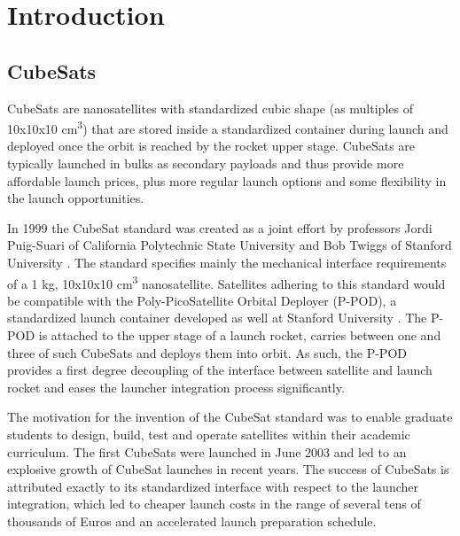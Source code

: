 \chapter{Introduction}

\section{CubeSats}

CubeSats are nanosatellites with standardized cubic shape (as multiples of 10x10x10 cm\textsuperscript{3}) that are stored inside a standardized container during launch and deployed once the orbit is reached by the rocket upper stage. CubeSats are typically launched in bulks as secondary payloads and thus provide more affordable launch prices, plus more regular launch options and some flexibility in the launch opportunities.

In 1999 the CubeSat standard was created as a joint effort by professors Jordi Puig-Suari of California Polytechnic State University and Bob Twiggs of Stanford University \cite{heidt2000cubesat}. The standard specifies mainly the mechanical interface requirements of a 1 kg, 10x10x10 cm\textsuperscript{3} nanosatellite. Satellites adhering to this standard would be compatible with the Poly-PicoSatellite Orbital Deployer (P-POD), a standardized launch container developed as well at Stanford University \cite{nason2002development}. The P-POD is attached to the upper stage of a launch rocket, carries between one and three of such CubeSats and deploys them into orbit. As such, the P-POD provides a first degree decoupling of the interface between satellite and launch rocket and eases the launcher integration process significantly.

The motivation for the invention of the CubeSat standard was to enable graduate students to design, build, test and operate satellites within their academic curriculum. The first CubeSats were launched in June 2003 and led to an explosive growth of CubeSat launches in recent years. The success of CubeSats is attributed exactly to its standardized interface with respect to the launcher integration, which led to cheaper launch costs in the range of several tens of thousands of Euros and an accelerated launch preparation schedule.

